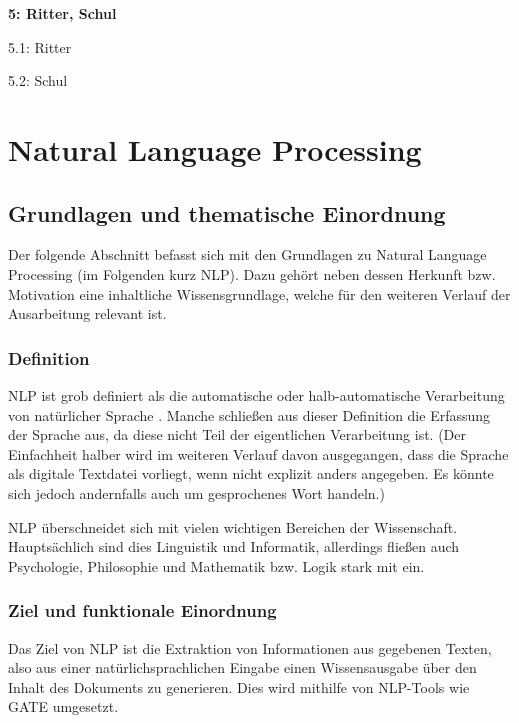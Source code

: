 \documentclass[12pt]{report}
\begin{document}
\begin{multicols}{2}
\begin{compactitem}
\item[] \textbf{5: Ritter, Schul}
\begin{compactitem}
\item[] 5.1: Ritter
\item[] 5.2: Schul
\end{compactitem}
\end{compactitem}
\end{multicols}

\chapter{Natural Language Processing}
\section{Grundlagen und thematische Einordnung}
Der folgende Abschnitt befasst sich mit den Grundlagen zu Natural Language Processing (im Folgenden kurz NLP). Dazu gehört neben dessen Herkunft bzw. Motivation eine inhaltliche Wissensgrundlage, welche für den weiteren Verlauf der Ausarbeitung relevant ist. 

\subsection{Definition}
NLP ist grob definiert als die automatische oder halb-automatische Verarbeitung von natürlicher Sprache \cite{cop04}. Manche schließen aus dieser Definition die Erfassung der Sprache aus, da diese nicht Teil der eigentlichen Verarbeitung ist. (Der Einfachheit halber wird im weiteren Verlauf davon ausgegangen, dass die Sprache als digitale Textdatei vorliegt, wenn nicht explizit anders angegeben. Es könnte sich jedoch andernfalls auch um gesprochenes Wort handeln.)

NLP überschneidet sich mit vielen wichtigen Bereichen der Wissenschaft. Hauptsächlich sind dies Linguistik und Informatik, allerdings fließen auch Psychologie, Philosophie und Mathematik bzw. Logik stark mit ein. 

\subsection{Ziel und funktionale Einordnung}
Das Ziel von NLP ist die Extraktion von Informationen aus gegebenen Texten, also aus einer natürlichsprachlichen Eingabe einen Wissensausgabe über den Inhalt des Dokuments zu generieren. Dies wird mithilfe von NLP-Tools wie GATE umgesetzt.
\end{document}

